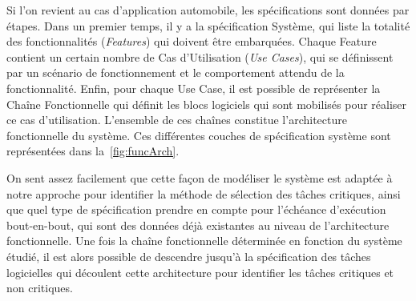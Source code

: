 \documentclass[french, a4paper, 11pt, twoside, pdftex]{StyleThese}
\begin{document}
	
		Si l'on revient au cas d'application automobile, les spécifications sont données par étapes. Dans un premier temps, il y a la spécification Système, qui liste la totalité des fonctionnalités (\emph{Features}) qui doivent être embarquées. Chaque Feature contient un certain nombre de Cas d'Utilisation (\emph{Use Cases}), qui se définissent par un scénario de fonctionnement et le comportement attendu de la fonctionnalité. Enfin, pour chaque Use Case, il est possible de représenter la Chaîne Fonctionnelle qui définit les blocs logiciels qui sont mobilisés pour réaliser ce cas d'utilisation. L'ensemble de ces chaînes constitue l'architecture fonctionnelle du système. Ces différentes couches de spécification système sont représentées dans la~\autoref{fig:funcArch}. %
		

	
		On sent assez facilement que cette façon de modéliser le système est adaptée à notre approche pour identifier la méthode de sélection des tâches critiques, ainsi que quel type de spécification prendre en compte pour l'échéance d'exécution bout-en-bout, qui sont des données déjà existantes au niveau de l'architecture fonctionnelle. Une fois la chaîne fonctionnelle déterminée en fonction du système étudié, il est alors possible de descendre jusqu'à la spécification des tâches logicielles qui découlent cette architecture pour identifier les tâches critiques et non critiques.
		
\end{document}
